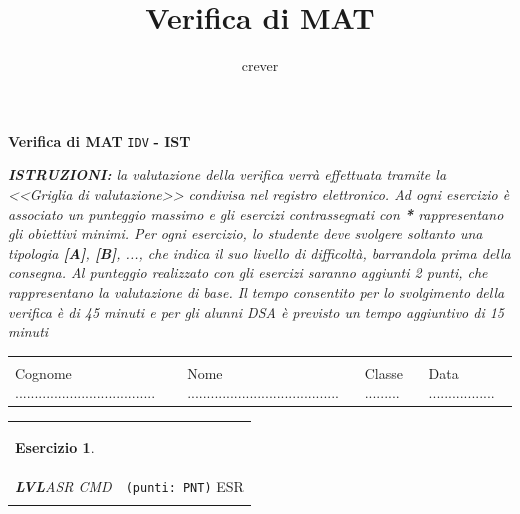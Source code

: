 \documentclass[a4paper,12pt]{article}
\title{Verifica di {MAT} }
\author{crever}
\theoremstyle{plain}
\newtheorem{esercizio}{Esercizio}
\begin{document}

\begin{center}
	{\textbf{Verifica di {MAT}} \verb!IDV! \textbf{- {IST} }}
\end{center}

\small{\textit{\textbf{ISTRUZIONI:} la valutazione della verifica verrà effettuata tramite la <<Griglia di valutazione>> condivisa nel registro
elettronico. Ad ogni esercizio è associato un punteggio massimo e gli esercizi contrassegnati con \emph{\textbf{*}} rappresentano gli obiettivi minimi. Per ogni esercizio, lo studente deve svolgere soltanto una tipologia \emph{\textbf{[A]}}, \emph{\textbf{[B]}}, ..., che indica il suo livello di difficolt{\`a}, barrandola prima della consegna. Al punteggio realizzato con gli esercizi saranno aggiunti 2 punti, che rappresentano la valutazione di base. Il tempo consentito per lo svolgimento della verifica è di 45 minuti e per gli alunni DSA è previsto un tempo aggiuntivo di 15 minuti}}

\begin{center}
	\begin{tabular}{llll}
		\hline
		&  &  & \\
		Cognome .................................... & 
		Nome ....................................... &
		Classe ......... & 
		Data .................\\
		\hline
	\end{tabular}
\end{center}


\begin{tabularx}{\textwidth}{ X X }
	\begin{esercizio}
	\end{esercizio}	
	&
	\\
	
	\emph{\textbf{LVL}{ASR} {CMD}} 
	&		
	\hspace*{\fill} \verb|(punti: PNT)|
	{ESR}
	\\
	\hline
	& \\	

\end{tabularx}
\end{document}
